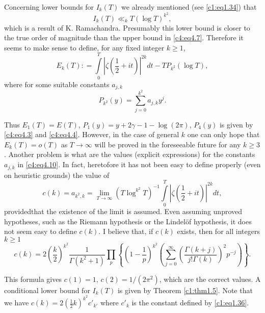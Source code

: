 Concerning lower bounds for $I_k (T)$ we already mentioned (see\break
\eqref{c1:eq1.34}) that
\begin{equation}
  I_k (T) \ll_k T(\log T)^{k^2}, \label{c4:eq4.8}
\end{equation}
which is a result of K. Ramachandra. Presumably this lower bound is
closer to the true order of magnitude than the upper bound in
\eqref{c4:eq4.7}. Therefore it seems to make sense to define, for any
fixed integer $k \geq 1$,
\begin{equation}
  E_k (T) : = \int\limits_0^T \left|\zeta \left(\frac{1}{2} + it
  \right)\right|^{2k} dt - TP_{k^2} (\log T), \label{c4:eq4.9}
\end{equation}
where for some suitable constants $a_{j, k}$
\begin{equation}
  P_{k^2} (y) = \sum_{j=0}^{k^2} a_{j, k}y^j. \label{c4:eq4.10}
\end{equation}

Thus $E_1 (T) = E(T)$, $P_1 (y) = y+ 2 \gamma -1- \log (2 \pi)$, $P_4
(y)$ is given by \eqref{c4:eq4.3} and \eqref{c4:eq4.4}. However, in
the case of general $k$ one can only hope that $E_k (T) = o(T)$ as $T
\to \infty$ will be proved in the foreseeable future for any $k \geq
3$. Another problem is what are the values (explicit expressions) for
the constants $a_{j, k}$ in \eqref{c4:eq4.10}. In fact, heretofore it
has not been easy to define properly (even on heuristic grounds) the
value of
\begin{equation}
  c(k) = a_{k^2, k}= \lim\limits_{T \to \infty} \left(T \log^{k^2}T\right)^{-1}
  \int\limits_0^T \left|\zeta \left(\frac{1}{2} + it \right)\right|^{2k}
  dt, \label{c4:eq4.11} 
\end{equation}
provided\pageoriginale that the existence of the limit is assumed. Even assuming
unproved hypotheses, such as the Riemann hypothesis or the Lindel\"of
hypothesis, it does not seem easy to define $c(k)$. I believe that, if
$c(k)$ exists, then for all integers $k \geq 1$
{\fontsize{10pt}{12pt}\selectfont
\begin{equation}
  c(k) = 2\left(\frac{k}{2} \right)^{k^2} \frac{1}{\Gamma (k^2 + 1)}
  \prod_p \left\{\left(1- \frac{1}{p} \right)^{k^2}
  \left(\sum_{j=0}^\infty \left(\frac{\Gamma (k+j)}{j! \Gamma (k)}
  \right)^2  p^{-j} \right)\right\}. \label{c4:eq4.12}
\end{equation}}

This formula gives $c(1) =1$, $c(2) = 1/(2 \pi^2)$, which are the
correct values. A conditional lower bound for $I_k (T)$ is given by
Theorem \ref{c1:thm1.5}. Note that we have $c(k) = 2
\left(\frac{1}{2}k \right)^{k^2} c'_{k'}$ where $c'_k$ is the constant
defined by \eqref{c1:eq1.36}.

